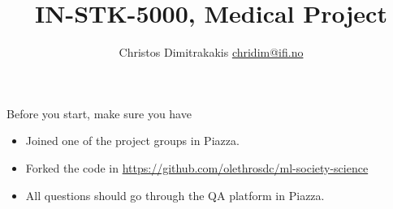 \documentclass[a4paper,twoside]{article}
\title{IN-STK-5000, Medical Project}
\author{Christos Dimitrakakis \url{chridim@ifi.no}}
\begin{document}
\maketitle

Before you start, make sure you have
\begin{itemize}
\item Joined one of the project groups in Piazza.
\item Forked the code in \url{https://github.com/olethrosdc/ml-society-science}
\item All questions should go through the QA platform in Piazza.
\end{itemize}


%
%
\end{document}
